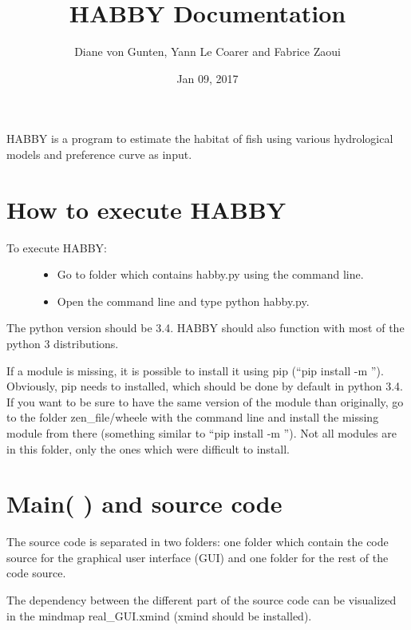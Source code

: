 \documentclass[letterpaper,10pt,english]{sphinxmanual}
\title{HABBY Documentation}
\date{Jan 09, 2017}
\author{Diane von Gunten, Yann Le Coarer and Fabrice Zaoui}
\begin{document}
\maketitle
\sphinxtableofcontents
{}\label{\detokenize{index::doc}}


HABBY is a program to estimate the habitat of fish using various hydrological models and preference curve as input.


\chapter{How to execute HABBY}
\label{\detokenize{index:how-to-execute-habby}}\label{\detokenize{index:welcome-to-habby-s-documentation}}\begin{description}
\item[{To execute HABBY:}] \leavevmode\begin{itemize}
\item {} 
Go to folder which contains habby.py using the command line.

\item {} 
Open the command line and type python habby.py.

\end{itemize}

\end{description}

The python version should be 3.4. HABBY should also function with most of the python 3 distributions.

If a module is missing, it is possible to install it using pip (``pip install -m ''). Obviously, pip needs to installed, which should be done by default in python 3.4. If you want to be sure to have the same version of the module than originally, go to the folder zen\_file/wheele with the command line and install the missing module from there (something similar to ``pip install -m ''). Not all modules are in this folder, only the ones which were difficult to install.


\chapter{Main(   ) and source code}
\label{\detokenize{index:main-and-source-code}}
The source code is separated in two folders: one folder which contain the code source for the graphical user interface (GUI) and one folder for the rest of the code source.

The dependency between the different part of the source code can be visualized in the mindmap real\_GUI.xmind (xmind should be installed).
\end{document}
